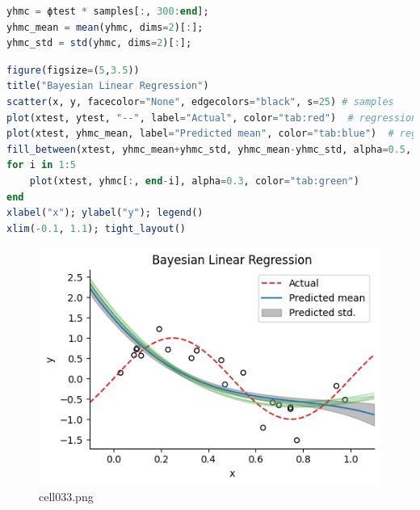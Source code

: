 \begin{lstlisting}[language=julia]
yhmc = ϕtest * samples[:, 300:end];
yhmc_mean = mean(yhmc, dims=2)[:];
yhmc_std = std(yhmc, dims=2)[:];
\end{lstlisting}
\begin{lstlisting}[language=julia]
figure(figsize=(5,3.5))
title("Bayesian Linear Regression")
scatter(x, y, facecolor="None", edgecolors="black", s=25) # samples
plot(xtest, ytest, "--", label="Actual", color="tab:red")  # regression line
plot(xtest, yhmc_mean, label="Predicted mean", color="tab:blue")  # regression line
fill_between(xtest, yhmc_mean+yhmc_std, yhmc_mean-yhmc_std, alpha=0.5, color="tab:gray", label="Predicted std.")
for i in 1:5
    plot(xtest, yhmc[:, end-i], alpha=0.3, color="tab:green")
end
xlabel("x"); ylabel("y"); legend()
xlim(-0.1, 1.1); tight_layout()
\end{lstlisting}
\begin{figure}[ht]
	\centering
	\includegraphics[scale=0.8, max width=\linewidth]{./fig/bayesian-brain/mcmc/cell033.png}
	\caption{cell033.png}
	\label{cell033.png}
\end{figure}
